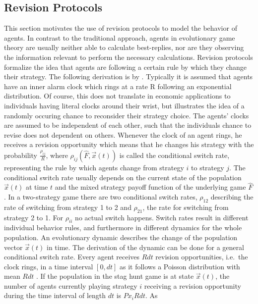 \subsection{Revision Protocols}
\label{sec:revisionprotocols}
This section motivates the use of revision protocols to
model the behavior of agents.
In contrast to the traditional approach, agents in evolutionary game theory 
are usually neither able to calculate best-replies, 
nor are they observing the information relevant
to perform the necessary calculations.
Revision protocols formalize the idea that agents are following a certain
rule by which they change their strategy. 
The following derivation is by \textcite{sandholm_population_2010}. 
Typically it is assumed that agents have an inner alarm clock 
which rings at a rate R following an exponential distribution. 
Of course, this does not translate 
in economic applications to individuals having literal clocks around their
wrist, but illustrates the idea of a randomly occuring chance to reconsider
their strategy choice.
The agents' clocks are assumed to be independent of each other, such that
the individuals chance to revise does not dependent on others.
Whenever the clock of an agent rings, he
receives a revision opportunity which means that he changes his strategy
with the probability $\frac{\rho_{ij}}{R}$, where
$\rho_{ij}(\hat{F},\vec{x}(t))$ is called the conditional switch rate,
representing the rule by which agents change from strategy 
$i$ to strategy $j$. The conditional switch rate usually depends
on the current state of the population $\vec{x}(t)$ at time $t$ and the
mixed strategy payoff function of the underlying game $\hat{F}$.
In a two-strategy game there are two conditional switch rates, $\rho_{12}$ 
describing the rate of switching from strategy 1 to 2 and $\rho_{21}$, 
the rate for switching from strategy 2 to 1. For $\rho_{ii}$ no actual switch 
happens.
Switch rates result in different individual behavior rules, and furthermore 
in different dynamics for the whole population. An evolutionary
dynamic describes the change of the population vector $\vec{x}(t)$ in time. 
The derivation of the dynamic can be done for a general conditional switch 
rate. 
Every agent receives $R dt$ revision opportunities, i.e.\ the clock rings, 
in a time interval $[0,dt]$ as it follows a Poisson distribution with
mean $Rdt$ \parencite[123]{sandholm_population_2010}. 
If the population in the stag hunt game is at state $\vec{x}(t)$, the number 
of agents currently playing strategy $i$ receiving a revision opportunity 
during the time interval of length $dt$ is $Px_i R dt$. As 
